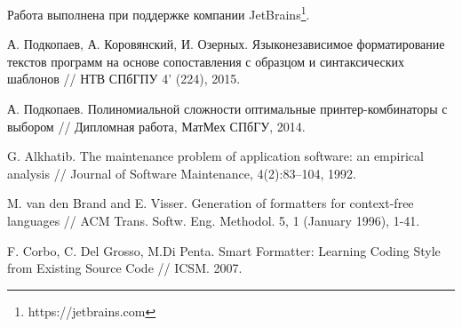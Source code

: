 \documentclass[conference]{IEEEtran}
\begin{document}
Работа выполнена при поддержке компании JetBrains\footnote{https://jetbrains.com}.

\nocite{*}


\begin{thebibliography}{4}

  А. Подкопаев, А. Коровянский, И. Озерных.
  Языконезависимое форматирование текстов программ
  на основе сопоставления с образцом и синтаксических шаблонов
  // НТВ СПбГПУ 4' (224), 2015.

  А. Подкопаев. Полиномиальной сложности оптимальные принтер-комбинаторы с выбором
  // Дипломная работа, МатМех СПбГУ, 2014.

  G. Alkhatib.
  The maintenance problem of application software:
an empirical analysis //
  Journal of Software Maintenance, 4(2):83–104, 1992.
  
 M. van den Brand and E. Visser.
Generation of formatters for context-free languages //
ACM Trans. Softw. Eng. Methodol. 5, 1 (January 1996), 1-41.

 F. Corbo, C. Del Grosso, M.Di Penta.
Smart Formatter: Learning Coding Style from Existing Source Code //
ICSM. 2007.

\end{thebibliography}
\end{document}
